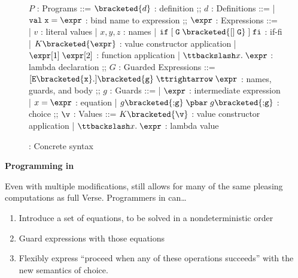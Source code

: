 \documentclass[manuscript,screen,review, 12pt, nonacm]{acmart}
\begin{document}
        \begin{figure}[H]
          \begin{center}
              \begin{bnf}
              $P$ : \textsf{Programs} ::=
              $\bracketed{d}$ : definition
              ;;
              $d$ : \textsf{Definitions} ::=
              | $\tt{val}\; x\; \tt{=}\; \expr$ : bind name to expression
              ;;
              $\expr$ : \textsf{Expressions} ::=
              | $v$ : literal values 
              | $x, y, z$ : names
              | $\tt{if}\; [\; G\; \bracketed{\tt{[]}\; G}\;]\; \tt{fi}$ : if-fi 
              | $K \bracketed{\expr}$ : value constructor application 
              | $\expr[1]\; \expr[2]$ : function application 
              | $\ttbackslash x\tt{.}\; \expr$ : lambda declaration 
              ;;
              $G$ : \textsf{Guarded Expressions} ::=  
              $[\tt{E }{\bracketed{x}}{\tt{.}}] \bracketed{g} \;\ttrightarrow\; \expr$ : names, guards, and body
              ;;
              $g$ : \textsf{Guards} ::=  
              | $\expr$ : intermediate expression 
              | $x \;\tt{=}\; \expr$ : equation 
              | $ g \bracketed{\tt{;} g} \; \pbar \; g \bracketed{\tt{;} g}$ : choice 
              ;;
              $\v$ : Values ::= $K\bracketed{\v}$ : value constructor application 
              | $\ttbackslash x\tt{.}\; \expr$ : lambda value
              \end{bnf}
          \end{center}
              \caption{\VMinus: Concrete syntax}
              \label{fig:vmsyntax}
              \end{figure}      

    \bf{Programming in \VMinus}


        
    Even with multiple modifications, \VMinus still allows for many of the same
    pleasing computations as full Verse. Programmers in \VMinus can\dots
        \begin{enumerate}
            \item Introduce a set of equations, to be solved in a
            nondeterministic order 
            \item Guard expressions with those equations 
            \item Flexibly express “proceed when any of these operations
            succeeds” with the new semantics of choice.  
        \end{enumerate}
\end{document}

